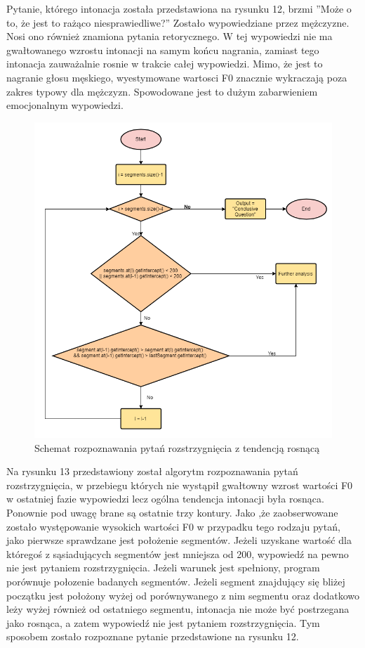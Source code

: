 \documentclass[a4paper,12 pt]{report}
\begin{document}
\FloatBarrier
Pytanie, którego intonacja została przedstawiona na rysunku 12, brzmi ''Może o to, że jest to rażąco niesprawiedliwe?'' Zostało wypowiedziane przez mężczyzne. Nosi ono również znamiona pytania retorycznego.  W tej wypowiedzi nie ma gwałtowanego wzrostu intonacji na samym końcu nagrania, zamiast tego intonacja zauważalnie rosnie w trakcie całej wypowiedzi. Mimo, że jest to nagranie głosu męskiego, wyestymowane wartosci F0 znacznie wykraczają poza zakres typowy dla mężczyzn. Spowodowane jest to dużym zabarwieniem emocjonalnym wypowiedzi.
 \FloatBarrier
\begin{figure}[h]
\centering
\includegraphics[scale=0.9]{conclusive2.png}
\caption{Schemat rozpoznawania pytań rozstrzygnięcia z tendencją rosnącą}
\end{figure}
\FloatBarrier
Na rysunku 13 przedstawiony został algorytm rozpoznawania pytań rozstrzygnięcia, w przebiegu których nie wystąpił gwałtowny wzrost wartości F0 w ostatniej fazie wypowiedzi lecz ogólna tendencja intonacji była rosnąca.
Ponownie pod uwagę brane są ostatnie trzy kontury. Jako ,że zaobserwowane zostało występowanie wysokich wartości F0 w przypadku tego rodzaju pytań, jako pierwsze sprawdzane jest położenie segmentów. Jeżeli uzyskane wartość dla któregoś z sąsiadujących segmentów jest mniejsza od 200, wypowiedź na pewno nie jest pytaniem rozstrzygnięcia. Jeżeli warunek jest spełniony, program porównuje połozenie badanych segmentów. Jeżeli segment znajdujący się bliżej początku jest położony wyżej od porównywanego z nim segmentu oraz dodatkowo leży wyżej również od ostatniego segmentu, intonacja nie może być postrzegana jako rosnąca, a zatem wypowiedź nie jest pytaniem rozstrzygnięcia. Tym sposobem zostało rozpoznane pytanie przedstawione na rysunku 12.
\end{document}
